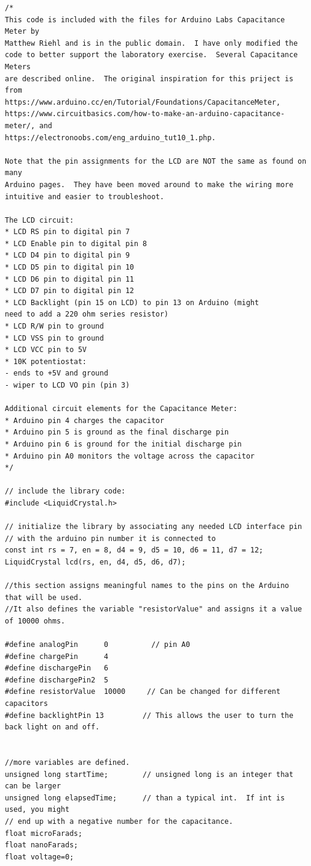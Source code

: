 \documentclass[]{article}
\begin{document}
\begin{verbatim}
/*
This code is included with the files for Arduino Labs Capacitance Meter by 
Matthew Riehl and is in the public domain.  I have only modified the
code to better support the laboratory exercise.  Several Capacitance Meters
are described online.  The original inspiration for this priject is from
https://www.arduino.cc/en/Tutorial/Foundations/CapacitanceMeter,  
https://www.circuitbasics.com/how-to-make-an-arduino-capacitance-meter/, and
https://electronoobs.com/eng_arduino_tut10_1.php.

Note that the pin assignments for the LCD are NOT the same as found on many  
Arduino pages.  They have been moved around to make the wiring more  
intuitive and easier to troubleshoot.

The LCD circuit:
* LCD RS pin to digital pin 7
* LCD Enable pin to digital pin 8
* LCD D4 pin to digital pin 9
* LCD D5 pin to digital pin 10
* LCD D6 pin to digital pin 11
* LCD D7 pin to digital pin 12
* LCD Backlight (pin 15 on LCD) to pin 13 on Arduino (might 
need to add a 220 ohm series resistor)
* LCD R/W pin to ground
* LCD VSS pin to ground
* LCD VCC pin to 5V
* 10K potentiostat:
- ends to +5V and ground
- wiper to LCD VO pin (pin 3)

Additional circuit elements for the Capacitance Meter:
* Arduino pin 4 charges the capacitor
* Arduino pin 5 is ground as the final discharge pin
* Arduino pin 6 is ground for the initial discharge pin
* Arduino pin A0 monitors the voltage across the capacitor
*/

// include the library code:
#include <LiquidCrystal.h>

// initialize the library by associating any needed LCD interface pin
// with the arduino pin number it is connected to
const int rs = 7, en = 8, d4 = 9, d5 = 10, d6 = 11, d7 = 12;
LiquidCrystal lcd(rs, en, d4, d5, d6, d7);

//this section assigns meaningful names to the pins on the Arduino that will be used.  
//It also defines the variable "resistorValue" and assigns it a value of 10000 ohms.

#define analogPin      0          // pin A0
#define chargePin      4         
#define dischargePin   6        
#define dischargePin2  5
#define resistorValue  10000     // Can be changed for different capacitors
#define backlightPin 13         // This allows the user to turn the back light on and off.


//more variables are defined.  
unsigned long startTime;        // unsigned long is an integer that can be larger
unsigned long elapsedTime;      // than a typical int.  If int is used, you might
// end up with a negative number for the capacitance.
float microFarads;              
float nanoFarads;
float voltage=0;


\end{verbatim}
\end{document}
